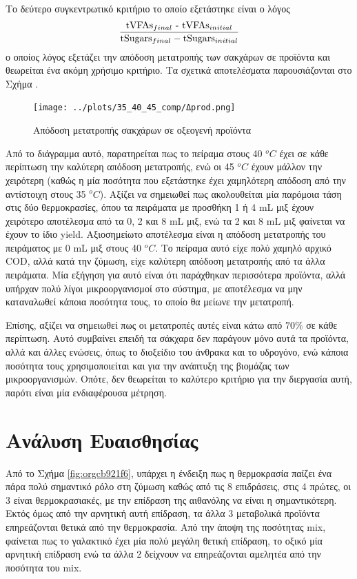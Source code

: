\documentclass[11pt]{report}
\begin{document}
Το δεύτερο συγκεντρωτικό κριτήριο το οποίο εξετάστηκε είναι ο λόγος \[ \frac{\text{tVFAs$_{final}$ - \text{tVFAs$_{initial}$}}}{\text{tSugars$_{final}$} -  \text{tSugars$_{initial}$}} \] ο οποίος λόγος εξετάζει την απόδοση μετατροπής των σακχάρων σε προϊόντα και θεωρείται ένα ακόμη χρήσιμο κριτήριο. Τα σχετικά αποτελέσματα παρουσιάζονται στο Σχήμα .

\begin{figure}[htbp]
\centering
\texttt{[image: ../plots/35\_40\_45\_comp/Δprod.png]}
\caption{Απόδοση μετατροπής σακχάρων σε οξεογενή προϊόντα}
\end{figure}

Από το διάγραμμα αυτό, παρατηρείται πως το πείραμα στους 40 \(^oC\) έχει σε κάθε περίπτωση την καλύτερη απόδοση μετατροπής, ενώ οι 45 \(^oC\) έχουν μάλλον την χειρότερη (καθώς η μία ποσότητα που εξετάστηκε έχει χαμηλότερη απόδοση από την αντίστοιχη στους 35 \(^oC\)). Αξίζει να σημειωθεί πως ακολουθείται μία παρόμοια τάση στις δύο θερμοκρασίες, όπου τα πειράματα με προσθήκη 1 ή 4 mL μιξ έχουν χειρότερο αποτέλεσμα από τα 0, 2 και 8 mL μιξ, ενώ τα 2 και 8 mL μιξ φαίνεται να έχουν το ίδιο yield. Αξιοσημείωτο αποτέλεσμα είναι η απόδοση μετατροπής του πειράματος με 0 mL μιξ στους 40 \(^oC\). Το πείραμα αυτό είχε πολύ χαμηλό αρχικό COD, αλλά κατά την ζύμωση, είχε καλύτερη απόδοση μετατροπής από τα άλλα πειράματα. Μία εξήγηση για αυτό είναι ότι παράχθηκαν περισσότερα προϊόντα, αλλά υπήρχαν πολύ λίγοι μικροοργανισμοί στο σύστημα, με αποτέλεσμα να μην καταναλωθεί κάποια ποσότητα τους, το οποίο θα μείωνε την μετατροπή.

Επίσης, αξίζει να σημειωθεί πως οι μετατροπές αυτές είναι κάτω από \(70 \%\) σε κάθε περίπτωση. Αυτό συμβαίνει επειδή τα σάκχαρα δεν παράγουν μόνο αυτά τα προϊόντα, αλλά και άλλες ενώσεις, όπως το διοξείδιο του άνθρακα και το υδρογόνο, ενώ κάποια ποσότητα τους χρησιμοποιείται και για την ανάπτυξη της βιομάζας των μικροοργανισμών. Οπότε, δεν θεωρείται το καλύτερο κριτήριο για την διεργασία αυτή, παρότι είναι μία ενδιαφέρουσα μέτρηση.

\section{Ανάλυση Ευαισθησίας}
\label{sec:org05b982b}
Από το Σχήμα \ref{fig:orgcb921f6}, υπάρχει η ένδειξη πως η θερμοκρασία παίζει ένα πάρα πολύ σημαντικό ρόλο στη ζύμωση καθώς από τις 8 επιδράσεις, στις 4 πρώτες, οι 3 είναι θερμοκρασιακές, με την επίδραση της αιθανόλης να είναι η σημαντικότερη. Εκτός όμως από την αρνητική αυτή επίδραση, τα άλλα 3 μεταβολικά προϊόντα επηρεάζονται θετικά από την θερμοκρασία. Από την άποψη της ποσότητας \acrshort{mix}, φαίνεται πως το γαλακτικό έχει μία πολύ μεγάλη θετική επίδραση, το οξικό μία αρνητική επίδραση ενώ τα άλλα 2 δείχνουν να επηρεάζονται αμελητέα από την ποσότητα του \acrshort{mix}.
\end{document}
